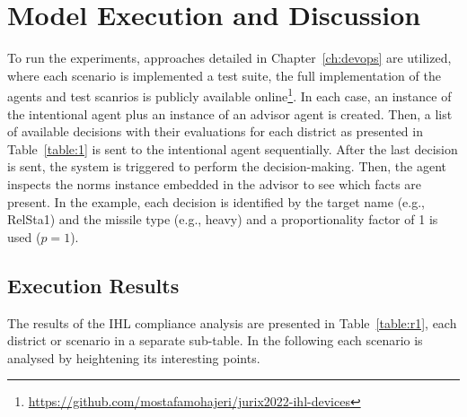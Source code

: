 %
%
%
%
\section{Model Execution and Discussion}
To run the experiments, approaches detailed in Chapter~\ref{ch:devops} are utilized, where each scenario is implemented a test suite, the full implementation of the agents and test scanrios is publicly available online\footnote{\url{https://github.com/mostafamohajeri/jurix2022-ihl-devices}}. In each case, an instance of the intentional agent plus an instance of an advisor agent is created. Then, a list of available decisions with their evaluations for each district as presented in Table~\ref{table:1} is sent to the intentional agent sequentially. After the last decision is sent, the system is triggered to perform the decision-making. Then, the agent inspects the norms instance embedded in the advisor to see which facts are present. In the example, each decision is identified by the target name (e.g., RelSta1) and the missile type (e.g., heavy) and a proportionality factor of 1 is used ($p=1$). 

\subsection{Execution Results}
The results of the IHL compliance analysis are presented in Table~\ref{table:r1}, each district or scenario in a separate sub-table. In the following each scenario is analysed by heightening its interesting points.

